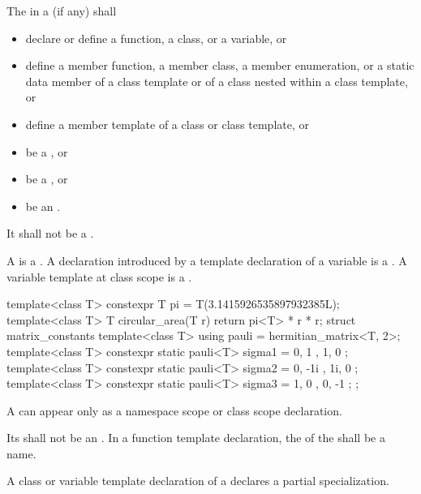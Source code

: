 \pnum
The  in a  (if any)
shall
\begin{itemize}
\item declare or define a function, a class, or a variable, or

\item define a member function, a member class, a member enumeration, or a static data member of a
class template or of a class nested within a class template, or

\item define a member template of a class or class template, or

\item be a , or

\item be a , or

\item be an .
\end{itemize}
It shall not be a .

\pnum
A  is a .
A declaration introduced by a template declaration of a
%
variable is a . A variable template at class scope is a
.

\begin{example}
\begin{codeblock}
template<class T>
  constexpr T pi = T(3.1415926535897932385L);
template<class T>
  T circular_area(T r) {
    return pi<T> * r * r;
  }
struct matrix_constants {
  template<class T>
    using pauli = hermitian_matrix<T, 2>;
  template<class T>
    constexpr static pauli<T> sigma1 = { { 0, 1 }, { 1, 0 } };
  template<class T>
    constexpr static pauli<T> sigma2 = { { 0, -1i }, { 1i, 0 } };
  template<class T>
    constexpr static pauli<T> sigma3 = { { 1, 0 }, { 0, -1 } };
};
\end{codeblock}
\end{example}

\pnum
\begin{note}
A 
can appear only as a namespace scope or class scope declaration.
\end{note}
Its  shall not be an
.
In a function template declaration, the  of the
 shall be a name.
\begin{note}
A class or variable template declaration of a 
declares a partial specialization.
\end{note}

